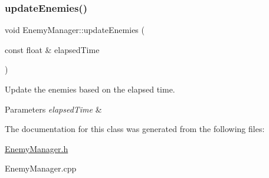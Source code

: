 \subsubsection{\texorpdfstring{update\+Enemies()}{updateEnemies()}}
{\footnotesize\ttfamily void Enemy\+Manager\+::update\+Enemies (\begin{DoxyParamCaption}\item[{const float \&}]{elapsed\+Time }\end{DoxyParamCaption})}



Update the enemies based on the elapsed time. 


\begin{DoxyParams}{Parameters}
{\em elapsed\+Time} & \\
\hline
\end{DoxyParams}


The documentation for this class was generated from the following files\+:\begin{DoxyCompactItemize}
\item 
\hyperlink{_enemy_manager_8h}{Enemy\+Manager.\+h}\item 
Enemy\+Manager.\+cpp\end{DoxyCompactItemize}
